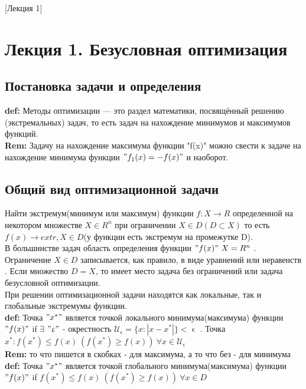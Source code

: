 [Лекция 1]

\newpage

\section*{Лекция 1. Безусловная оптимизация}
\subsection*{Постановка задачи и определения}

\textbf{def:} Методы оптимизации --- это раздел математики, посвящённый решению (экстремальных) задач, то есть задач на нахождение минимумов и максимумов функций.\\ [2mm]
\textbf{Rem:} Задачу на нахождение максимума функции "f(x)" можно свести к задаче на нахождение минимума функции $"f_1(x) = -f(x)"$ и наоборот.
\subsection*{Общий вид оптимизационной задачи}
Найти экстремум(минимум или максимум) функции $f: X \rightarrow R$ определенной на некотором множестве $X \in R^n$ при ограничении $X \in D (D \subset X)$ то есть $f(x) \rightarrow extr, X\in D$(у функции есть экстремум на промежутке D).\\
В большинстве задач область определения функции $"f(x)" \  X=R^n$ . Ограничение $X\in D$ записывается, как правило, в виде уравнений или неравенств . Если множество $D=X$, то имеет место задача без ограничений или {задача безусловной оптимизации}. \\
При решении оптимизационной задачи находятся как {локальные}, так и {глобальные экстремумы функции}. \\[2mm]
\textbf{def:} Точка $" x^* "$ является точкой {локального минимума(максимума) функции} $"f(x)" $ if $ \exists$ $"\upvarepsilon "$ - окрестность $ \mathcal{U}_ \upvarepsilon = \{ x :  |x-x^*| \} < \upvarepsilon $ .
Точка $x^* : f(x^*) \leq f(x) \  (f(x^*) \geq f(x)) \ \forall x \in \mathcal{U}_ \upvarepsilon $ \\ [2mm]
\textbf{Rem:} то что пишется в скобках - для максимума, а то что без - для минимума \\ [2mm]
\textbf{def:} Точка $"x^*" $ является точкой {глобального минимума(максимума)} функции $"f(x)"$ if $ f(x^*) \leq f(x) \  (f(x^*) \geq f(x)) \  \forall x \in D $

